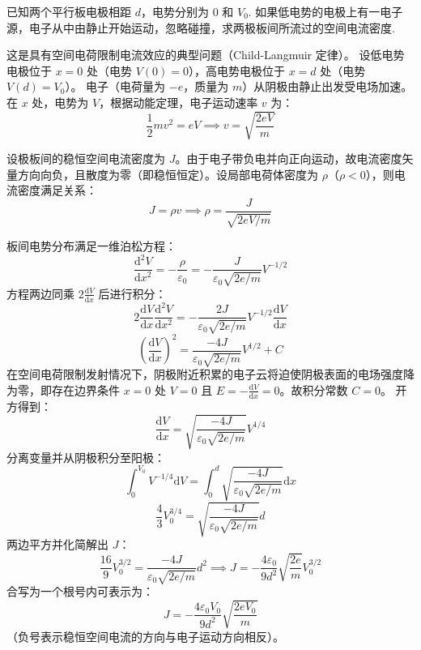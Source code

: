 \begin{exercise}\label{ex:16.11}
已知两个平行板电极相距 $d$，电势分别为 $0$ 和 $V_0$. 如果低电势的电极上有一电子源，电子从中由静止开始运动，忽略碰撞，求两极板间所流过的空间电流密度.
\end{exercise}
\begin{solution}
这是具有空间电荷限制电流效应的典型问题（Child-Langmuir 定律）。
设低电势电极位于 $x=0$ 处（电势 $V(0) = 0$），高电势电极位于 $x=d$ 处（电势 $V(d) = V_0$）。
电子（电荷量为 $-e$，质量为 $m$）从阴极由静止出发受电场加速。在 $x$ 处，电势为 $V$，根据动能定理，电子运动速率 $v$ 为：
$$ \frac{1}{2} m v^2 = e V \implies v = \sqrt{\frac{2eV}{m}} $$

设极板间的稳恒空间电流密度为 $J$。由于电子带负电并向正向运动，故电流密度矢量方向向负，且散度为零（即稳恒恒定）。设局部电荷体密度为 $\rho$（$\rho < 0$），则电流密度满足关系：
$$ J = \rho v \implies \rho = \frac{J}{\sqrt{2eV/m}} $$

板间电势分布满足一维泊松方程：
$$ \frac{\mathrm{d}^2 V}{\mathrm{d}x^2} = -\frac{\rho}{\varepsilon_0} = -\frac{J}{\varepsilon_0 \sqrt{2e/m}} V^{-1/2} $$
方程两边同乘 $2 \frac{\mathrm{d}V}{\mathrm{d}x}$ 后进行积分：
$$ 2 \frac{\mathrm{d}V}{\mathrm{d}x} \frac{\mathrm{d}^2 V}{\mathrm{d}x^2} = -\frac{2J}{\varepsilon_0 \sqrt{2e/m}} V^{-1/2} \frac{\mathrm{d}V}{\mathrm{d}x} $$
$$ \left( \frac{\mathrm{d}V}{\mathrm{d}x} \right)^2 = \frac{-4J}{\varepsilon_0 \sqrt{2e/m}} V^{1/2} + C $$
在空间电荷限制发射情况下，阴极附近积累的电子云将迫使阴极表面的电场强度降为零，即存在边界条件 $x=0$ 处 $V=0$ 且 $E = -\frac{\mathrm{d}V}{\mathrm{d}x} = 0$。故积分常数 $C = 0$。
开方得到：
$$ \frac{\mathrm{d}V}{\mathrm{d}x} = \sqrt{ \frac{-4J}{\varepsilon_0 \sqrt{2e/m}} } V^{1/4} $$
分离变量并从阴极积分至阳极：
$$ \int_0^{V_0} V^{-1/4} \mathrm{d}V = \int_0^d \sqrt{ \frac{-4J}{\varepsilon_0 \sqrt{2e/m}} } \mathrm{d}x $$
$$ \frac{4}{3} V_0^{3/4} = \sqrt{ \frac{-4J}{\varepsilon_0 \sqrt{2e/m}} } d $$
两边平方并化简解出 $J$：
$$ \frac{16}{9} V_0^{3/2} = \frac{-4J}{\varepsilon_0 \sqrt{2e/m}} d^2 \implies J = -\frac{4\varepsilon_0}{9 d^2} \sqrt{\frac{2e}{m}} V_0^{3/2} $$
合写为一个根号内可表示为：
$$ J = -\frac{4\varepsilon_0 V_0}{9d^2} \sqrt{\frac{2eV_0}{m}} $$
（负号表示稳恒空间电流的方向与电子运动方向相反）。
\end{solution}

